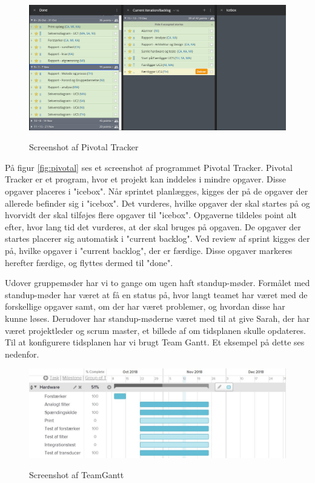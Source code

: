 	\begin{figure}[h!]
	\centering
	\includegraphics[width=0.9\linewidth]{Udviklingsproces/Metode/PivotalTracker}
	\label{fig:pivotal}
	\caption{Screenshot af Pivotal Tracker}
\end{figure}

På figur \vref{fig:pivotal} ses et screenshot af programmet Pivotal Tracker. Pivotal Tracker er et program, hvor et projekt kan inddeles i mindre opgaver. Disse opgaver placeres i "icebox". Når sprintet planlægges, kigges der på de opgaver der allerede befinder sig i "icebox". Det vurderes, hvilke opgaver der skal startes på og hvorvidt der skal tilføjes flere opgaver til "icebox". Opgaverne tildeles point alt efter, hvor lang tid det vurderes, at der skal bruges på opgaven. De opgaver der startes placerer sig automatisk i "current backlog". Ved review af sprint kigges der på, hvilke opgaver i "current backlog", der er færdige. Disse opgaver markeres herefter færdige, og flyttes dermed til "done". 

Udover gruppemøder har vi to gange om ugen haft standup-møder. Formålet med standup-møder har været at få en status på, hvor langt teamet har været med de forskellige opgaver samt, om der har været problemer, og hvordan disse har kunne løses. Derudover har standup-møderne været med til at give Sarah, der har været projektleder og scrum master, et billede af om tidsplanen skulle opdateres. Til at konfigurere tidsplanen har vi brugt Team Gantt. Et eksempel på dette ses nedenfor. 

	\begin{figure}[h!]
	\centering
	\includegraphics[width=0.9\linewidth]{Udviklingsproces/Metode/TeamGantt}
	\label{fig:teamgantt}
	\caption{Screenshot af TeamGantt}
\end{figure}

